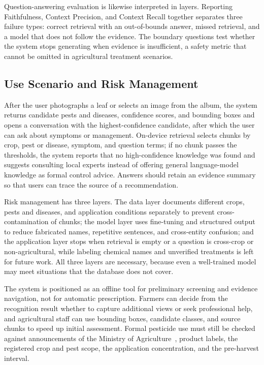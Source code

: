 \documentclass[10pt,twocolumn,a4paper]{article}
\begin{document}
Question-answering evaluation is likewise interpreted in layers. Reporting Faithfulness, Context Precision, and Context Recall together separates three failure types: correct retrieval with an out-of-bounds answer, missed retrieval, and a model that does not follow the evidence. The boundary questions test whether the system stops generating when evidence is insufficient, a safety metric that cannot be omitted in agricultural treatment scenarios.

\subsection{Use Scenario and Risk Management}
After the user photographs a leaf or selects an image from the album, the system returns candidate pests and diseases, confidence scores, and bounding boxes and opens a conversation with the highest-confidence candidate, after which the user can ask about symptoms or management. On-device retrieval selects chunks by crop, pest or disease, symptom, and question terms; if no chunk passes the thresholds, the system reports that no high-confidence knowledge was found and suggests consulting local experts instead of offering general language-model knowledge as formal control advice. Answers should retain an evidence summary so that users can trace the source of a recommendation.

Risk management has three layers. The data layer documents different crops, pests and diseases, and application conditions separately to prevent cross-contamination of chunks; the model layer uses fine-tuning and structured output to reduce fabricated names, repetitive sentences, and cross-entity confusion; and the application layer stops when retrieval is empty or a question is cross-crop or non-agricultural, while labeling chemical names and unverified treatments is left for future work. All three layers are necessary, because even a well-trained model may meet situations that the database does not cover.

The system is positioned as an offline tool for preliminary screening and evidence navigation, not for automatic prescription. Farmers can decide from the recognition result whether to capture additional views or seek professional help, and agricultural staff can use bounding boxes, candidate classes, and source chunks to speed up initial assessment. Formal pesticide use must still be checked against announcements of the Ministry of Agriculture~\cite{moa2026}, product labels, the registered crop and pest scope, the application concentration, and the pre-harvest interval.
\end{document}
